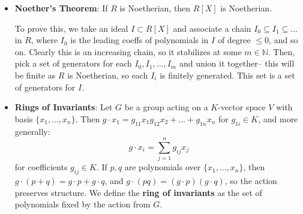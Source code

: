 \documentclass[11pt, oneside]{amsart}   	%
\theoremstyle{definition}
\newtheorem{theorem}{Theorem}[section]
\begin{document}
\begin{itemize}
	\begin{theorem}
		If $R$ is a ring, TFAE:
		\begin{enumerate}
			\item $R$ is Noetherian.
			\item Every nonempty set of ideals has a maximal element.
			\item Every strictly increasing chain $I_1\subseteq I_2\subseteq ...$ stabilizes. 
		\end{enumerate}
	\end{theorem}
	
	To prove this, we show that $ii\iff iii$, which is just a general statement about partially ordered sets. Then, we show that $i\iff iii$. Note that we can 
	equally define a Noetherian ring as a ring where every increasing chain of ideals stabilizes. Likewise, we can define the notion of an \textbf{Artinian 
	ring}: this is one where every decreasing set of ideals stabilizes. $\mathbb Z$ is not Artinian; consider the ideals generated by $2^n$ for $n\in 
	\mathbb N$. 
	
	\item \textbf{Noether's Theorem}: If $R$ is Noetherian, then $R[X]$ is Noetherian. 
	
	To prove this, we take an ideal $I\subset R[X]$ and associate a chain $I_0\subseteq I_1\subseteq ...$ in $R$, where $I_0$ is the leading coeffs of 
	polynomials in $I$ of degree $\leq 0$, and so on. Clearly this is an increasing chain, so it stabilizes at some $m\in\mathbb N$. Then, pick a set of 
	generators for each $I_0, I_1, ..., I_m$ and union it together-- this will be finite as $R$ is Noetherian, so each $I_i$ is finitely generated. This set 
	is a set of generators for $I$. 
	
	\item \textbf{Rings of Invariants}: Let $G$ be a group acting on a $K$-vector space $V$ with basis $\{x_1, ..., x_n\}$. Then $g\cdot x_1 = g_{11}x_1 
	g_{12}x_2+ ... + g_{1n}x_n$ for $g_{1i}\in K$, and more generally:
	$$
		g\cdot x_i = \sum_{j = 1}^ng_{ij}x_j
	$$
	for coefficients $g_{ij}\in K$. If $p, q$ are polynomials over $\{x_1, ..., x_n\}$, then $g\cdot (p + q) = g\cdot p + g\cdot q$, and $g\cdot(pq) = 
	(g\cdot p)(g\cdot q)$, so the action preserves structure. We define the \textbf{ring of invariants} as the set of polynomials fixed by the action from $G$. 
	

\end{itemize}
\end{document}
